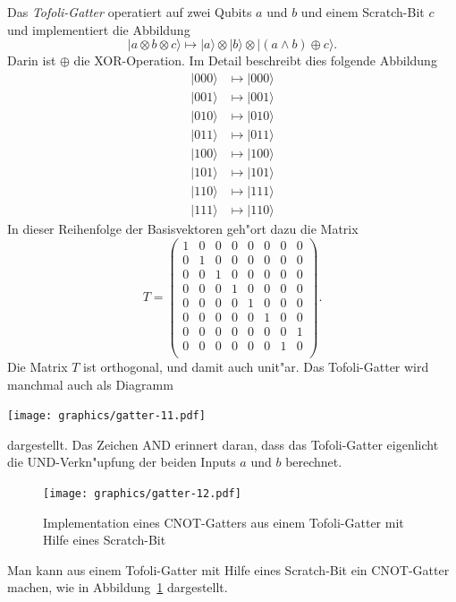\begin{beispiel}
Das {\em Tofoli-Gatter} operatiert auf zwei Qubits $a$ und $b$ und einem
Scratch-Bit $c$ und implementiert die Abbildung
\[
|a\otimes b\otimes c\rangle
\mapsto
|a\rangle\otimes|b\rangle\otimes|(a\wedge b)\oplus c\rangle.
\]
Darin ist $\oplus$ die XOR-Operation. 
Im Detail beschreibt dies folgende Abbildung
\begin{align*}
|000\rangle&\mapsto|000\rangle\\
|001\rangle&\mapsto|001\rangle\\
|010\rangle&\mapsto|010\rangle\\
|011\rangle&\mapsto|011\rangle\\
|100\rangle&\mapsto|100\rangle\\
|101\rangle&\mapsto|101\rangle\\
|110\rangle&\mapsto|111\rangle\\
|111\rangle&\mapsto|110\rangle
\end{align*}
In dieser Reihenfolge der Basisvektoren geh"ort dazu die Matrix
\[
T=
\begin{pmatrix}
1&0&0&0&0&0&0&0\\
0&1&0&0&0&0&0&0\\
0&0&1&0&0&0&0&0\\
0&0&0&1&0&0&0&0\\
0&0&0&0&1&0&0&0\\
0&0&0&0&0&1&0&0\\
0&0&0&0&0&0&0&1\\
0&0&0&0&0&0&1&0\\
\end{pmatrix}.
\]
Die Matrix $T$ ist orthogonal, und damit auch unit"ar.
Das Tofoli-Gatter wird manchmal auch als Diagramm
\begin{center}
\texttt{[image: graphics/gatter-11.pdf]}
\end{center}
dargestellt. Das Zeichen \textsc{AND} erinnert daran, dass das Tofoli-Gatter
eigenlicht die UND-Verkn"upfung der beiden Inputs $a$ und $b$ berechnet.
\end{beispiel}

\begin{beispiel}
\begin{figure}
\centering
\texttt{[image: graphics/gatter-12.pdf]}
\caption{Implementation eines \textsc{CNOT}-Gatters aus einem Tofoli-Gatter
mit Hilfe eines Scratch-Bit \label{skript:cnot=tofoli}}
\end{figure}
Man kann aus einem Tofoli-Gatter mit Hilfe eines Scratch-Bit ein
\textsc{CNOT}-Gatter machen, wie in Abbildung~\ref{skript:cnot=tofoli}
dargestellt.
\end{beispiel}

